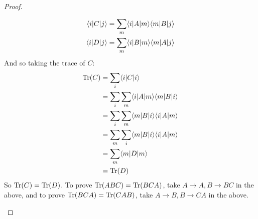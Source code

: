 \begin{proof}
\begin{enumerate}
        \begin{equation}
            \begin{split}
                \langle i \rvert C\lvert j \rangle &= \sum_m \langle i \rvert A \lvert m \rangle \langle m \rvert B\lvert j \rangle
                \\ \langle i \rvert D\lvert j \rangle &= \sum_m \langle i \rvert B\lvert m \rangle \langle m \rvert A\lvert j \rangle
            \end{split}
        \end{equation}
        And so taking the trace of $C$:
        \begin{equation}
            \begin{split}
                \mathrm{Tr}(C) &= \sum_i \langle i \rvert C\lvert i \rangle
                \\ &= \sum_i \sum_m \langle i \rvert A \lvert m \rangle \langle m \rvert B\lvert i \rangle
                \\ &= \sum_i \sum_m \langle m \rvert B\lvert i \rangle\langle i \rvert A\lvert m \rangle
                \\ &= \sum_m \sum_i \langle m \rvert B\lvert i \rangle\langle i \rvert A\lvert m \rangle
                \\ &= \sum_m \langle m \rvert D\lvert m \rangle
                \\ &= \mathrm{Tr}(D)
            \end{split}
        \end{equation}
        So $\mathrm{Tr}(C) = \mathrm{Tr}(D)$. To prove $\mathrm{Tr}(ABC) = \mathrm{Tr}(BCA)$, take $A \to A, B \to BC$ in the above, and to prove $\mathrm{Tr}(BCA) = \mathrm{Tr}(CAB)$, take $A \to B, B \to CA$ in the above. 
    \end{enumerate}
\end{proof}


